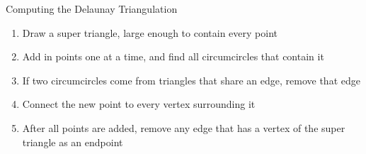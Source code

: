 \begin{frame}{Computing the Delaunay Triangulation}
	\begin{enumerate}
		\item Draw a super triangle, large enough to contain every point
		\item Add in points one at a time, and find all circumcircles that contain it
		\item If two circumcircles come from triangles that share an edge, remove that edge
		\item Connect the new point to every vertex surrounding it
		\item After all points are added, remove any edge that has a vertex of the super triangle as an endpoint
	\end{enumerate}
	
\end{frame}
